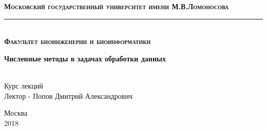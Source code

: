 \begin{titlepage}

\newcommand{\HRule}{\rule{\linewidth}{0.3mm}} %

\center

\textbf{\textsc{\Large Московский государственный университет} \textsc{\large имени }\textsc{\Large М.В.Ломоносова}}
\\[0.3cm] 
\HRule 
\\[0.3cm]
\textbf{\textsc{\large Факультет биоинженерии и биоинформатики}}
\\[4.0cm]

\begin{spacing}{1.4}
{ \LARGE \bfseries Численные методы в задачах обработки данных} \\[1.0cm]

\end{spacing}
 
 
\Large \emph{}\\
Курс лекций \\
Лектор - Попов Дмитрий Александрович
\\[4cm]

\begin{abstract}
	Курс включает обзор основных численных методов, применяемых при обработке экспериментальных данных. Основные темы курса: полиномиальная аппроксимация, интерполяция, сплайны, численное дифференцирование и интегрирование, метод наименьших квадратов, методы решения систем линейных уравнений, решение нелинейных уравнений и оптимизация, анализ Фурье.
\end{abstract}


\vfill

{\large Москва \\ 2018}


\end{titlepage}

